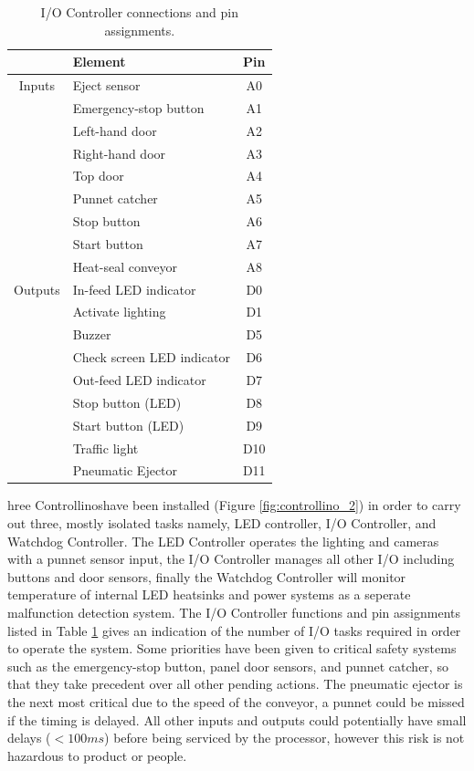 \documentclass[fleqn,twoside]{article}
\begin{document}
\begin{table}[h]
	\centering
	\caption{I/O Controller connections and pin assignments.}
	\label{tab:IO_tasks}
	\begin{tabularx}{0.5\linewidth}{cXc}
		\toprule
				& \textbf{Element} & \textbf{Pin} \\[8pt]
		\midrule
		Inputs 	& Eject sensor 			& A0 \\[4pt]
				& Emergency-stop button	& A1 \\[4pt]
				& Left-hand door 		& A2 \\[4pt]
				& Right-hand door 		& A3 \\[4pt]
				& Top door 				& A4 \\[4pt]
				& Punnet catcher 		& A5 \\[4pt]
				& Stop button 			& A6 \\[4pt]
				& Start button	 		& A7 \\[4pt]
				& Heat-seal conveyor	& A8 \\[4pt]
				
		Outputs	& In-feed LED indicator			& D0  \\[4pt]
				& Activate lighting				& D1  \\[4pt]
				& Buzzer						& D5  \\[4pt]
				& Check screen LED indicator	& D6  \\[4pt]
				& Out-feed LED indicator 		& D7  \\[4pt]
				& Stop button (LED)				& D8  \\[4pt]
				& Start button (LED)			& D9  \\[4pt]
				& Traffic light					& D10  \\[4pt]
				& Pneumatic Ejector				& D11  \\[4pt]
		\bottomrule
		
	\end{tabularx}
\end{table}


hree Controllinos\texttrademark have been installed (Figure \ref{fig:controllino_2}) in order to carry out three, mostly isolated tasks namely, LED controller, I/O Controller, and Watchdog Controller. The LED Controller operates the lighting and cameras with a punnet sensor input, the I/O Controller manages all other I/O including buttons and door sensors, finally the Watchdog Controller will monitor temperature of internal LED heatsinks and power systems as a seperate malfunction detection system.
The I/O Controller functions and pin assignments listed in Table \ref{tab:IO_tasks} gives an indication of the number of I/O tasks required in order to operate the system. Some priorities have been given to critical safety systems such as the emergency-stop button, panel door sensors, and punnet catcher, so that they take precedent over all other pending actions. The pneumatic ejector is the next most critical due to the speed of the conveyor, a punnet could be missed if the timing is delayed. All other inputs and outputs could potentially have small delays ($<100ms$) before being serviced by the processor, however this risk is not hazardous to product or people.
\end{document}
